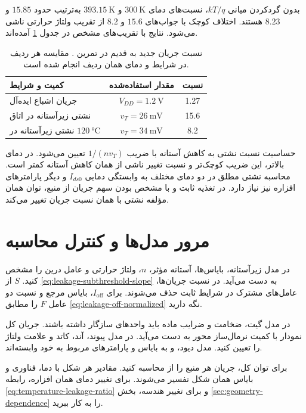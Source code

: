 بدون گردکردن میانی \(kT/q\)، نسبت‌های دمای
\(\qty{300}{\kelvin}\) و \(\qty{393.15}{\kelvin}\) به‌ترتیب
حدود \(15.85\) و \(8.23\) هستند.
اختلاف کوچک با جواب‌های \(15.6\) و \(8.2\) از تقریب ولتاژ
حرارتی ناشی می‌شود. نتایج با تقریب‌های مشخص در جدول
\ref{tab:leakage-ex10-results} آمده‌اند.
\begin{table}[!htbp]
\centering
\small
\caption{نسبت جریان جدید به قدیم در تمرین . مقایسه هر ردیف در
شرایط و دمای همان ردیف انجام شده است.}
\label{tab:leakage-ex10-results}
\begin{tabularx}{\linewidth}{>{\raggedleft\arraybackslash}Xcc}
\toprule
کمیت و شرایط & مقدار استفاده‌شده & نسبت\\
\midrule
جریان اشباع ایده‌آل & \(V_{DD}=\qty{1.2}{\volt}\) & \num{1.27}\\
نشتی زیرآستانه در اتاق & \(v_T=\qty{26}{\milli\volt}\) & \num{15.6}\\
نشتی زیرآستانه در \(\qty{120}{\degreeCelsius}\) & \(v_T=\qty{34}{\milli\volt}\) & \num{8.2}\\
\bottomrule
\end{tabularx}
\end{table}

حساسیت نسبت نشتی به کاهش آستانه با ضریب \(1/(nv_T)\) تعیین
می‌شود. در دمای بالاتر، این ضریب کوچک‌تر و نسبت تغییر ناشی از
همان کاهش آستانه کمتر است. محاسبه نشتی مطلق در دو دمای مختلف به
وابستگی دمایی \(I_{ds0}\) و دیگر پارامترهای افزاره نیز نیاز دارد.
در تغذیه ثابت و با مشخص بودن سهم جریان از منبع، توان همان مؤلفه
نشتی با همان نسبت جریان تغییر می‌کند.

\section*{مرور مدل‌ها و کنترل محاسبه}
در مدل زیرآستانه، بایاس‌ها، آستانه مؤثر، \(n\)، ولتاژ حرارتی و عامل
درین را مشخص کنید. \(S\) از \eqref{eq:leakage-subthreshold-slope}
به دست می‌آید. در نسبت جریان‌ها، عامل‌های مشترک در شرایط ثابت حذف
می‌شوند. برای \(I_{\mathrm{off}}\)، بایاس مرجع و نسبت دو عامل \(F\)
را مطابق \eqref{eq:leakage-off-normalized} نگه دارید.

در مدل گیت، ضخامت و ضرایب ماده باید واحدهای سازگار داشته باشند.
جریان کل نمودار با کمیت نرمال‌ساز محور به دست می‌آید. در مدل پیوند،
آند، کاتد و علامت ولتاژ را تعیین کنید. مدل دیود،  و
 به بایاس و پارامترهای مربوط به خود وابسته‌اند.

برای توان کل، جریان هر منبع را از  محاسبه کنید.
مقادیر هر شکل با دما، فناوری و بایاس همان شکل تفسیر می‌شوند.
برای تغییر دمای همان افزاره، رابطه \eqref{eq:temperature-leakage-ratio}
و برای تغییر هندسه، بخش \ref{sec:geometry-dependence} را به کار ببرید.
